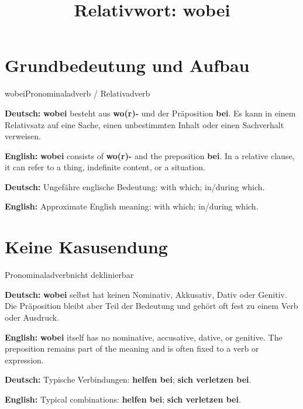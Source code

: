 \documentclass[a4paper,11pt]{article}
\title{Relativwort: \glqq wobei\grqq{}}
\date{}
\newcommand{\GermanText}[1]{\textbf{Deutsch: }#1\par}
\newcommand{\EnglishText}[1]{{\small\color{SoftGray}\textbf{English: }#1\par}}
\begin{document}
\maketitle

\tableofcontents

\newpage

\section{Grundbedeutung und Aufbau}

\begin{grammarentry}{wobei}{Pronominaladverb / Relativadverb}

\GermanText{\textbf{wobei} besteht aus \textbf{wo(r)-} und der Präposition \textbf{bei}. Es kann in einem Relativsatz auf eine Sache, einen unbestimmten Inhalt oder einen Sachverhalt verweisen.}

\EnglishText{\textbf{wobei} consists of \textbf{wo(r)-} and the preposition \textbf{bei}. In a relative clause, it can refer to a thing, indefinite content, or a situation.}

\GermanText{Ungefähre englische Bedeutung: \glqq with which; in/during which\grqq{}.}

\EnglishText{Approximate English meaning: \glqq with which; in/during which\grqq{}.}

\end{grammarentry}

\section{Keine Kasusendung}

\begin{grammarentry}{Pronominaladverb}{nicht deklinierbar}

\GermanText{\textbf{wobei} selbst hat keinen Nominativ, Akkusativ, Dativ oder Genitiv. Die Präposition bleibt aber Teil der Bedeutung und gehört oft fest zu einem Verb oder Ausdruck.}

\EnglishText{\textbf{wobei} itself has no nominative, accusative, dative, or genitive. The preposition remains part of the meaning and is often fixed to a verb or expression.}

\GermanText{Typische Verbindungen: \textbf{helfen bei}; \textbf{sich verletzen bei}.}

\EnglishText{Typical combinations: \textbf{helfen bei}; \textbf{sich verletzen bei}.}

\end{grammarentry}
\end{document}
